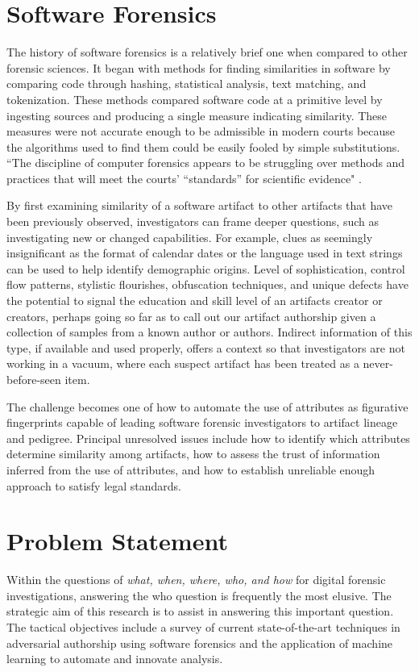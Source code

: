 \documentclass[12pt]{report}
\begin{document}
\section{Software Forensics}
  The history of software forensics is a relatively brief one when compared to other forensic sciences.  It began with methods for finding similarities in software by comparing code through hashing, statistical analysis, text matching, and tokenization.  These methods compared software code at a primitive level by ingesting sources and producing a single measure indicating similarity.  These measures were not accurate enough to be admissible in modern courts because the algorithms used to find them could be easily fooled by simple substitutions.  ``The discipline of computer forensics appears to be struggling over methods and practices that will meet the courts’ “standards” for scientific evidence" \cite{meyers2005digital}.

By first examining similarity of a software artifact to other artifacts that have been previously observed, investigators can frame deeper questions, such as investigating new or changed capabilities.  For example, clues as seemingly insignificant as the format of calendar dates or the language used in text strings can be used to help identify demographic origins.  Level of sophistication, control flow patterns, stylistic flourishes, obfuscation techniques, and unique defects have the potential to signal the education and skill level of an artifacts creator or creators, perhaps going so far as to call out our artifact authorship given a collection of samples from a known author or authors.  Indirect information of this type, if available and used properly, offers a context so that investigators are not working in a vacuum, where each suspect artifact has been treated as a never-before-seen item.

The challenge becomes one of how to automate the use of attributes as figurative fingerprints capable of leading software forensic investigators to artifact lineage and pedigree.  Principal unresolved issues include how to identify which attributes determine similarity among artifacts, how to assess the trust of information inferred from the use of attributes, and how to establish unreliable enough approach to satisfy legal standards.

\section{Problem Statement}
\label{sec:ProbState}
Within the questions of \emph{what, when, where, who, and how} for digital forensic investigations, answering the who question is frequently the most elusive.  The strategic aim of this research is to assist in answering this important question.  The tactical objectives include a survey of current state-of-the-art techniques in adversarial authorship using software forensics and the application of machine learning to automate and innovate analysis.
\end{document}
